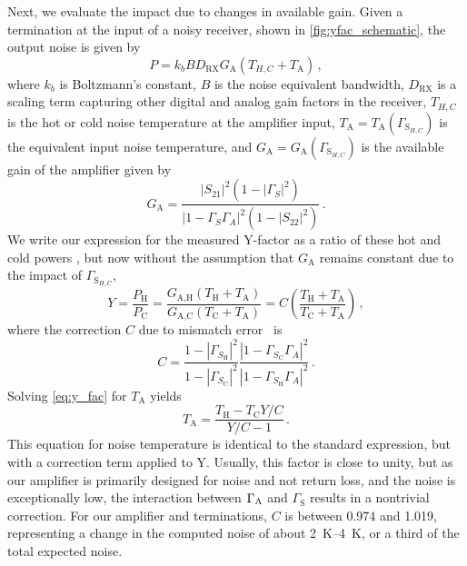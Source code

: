 Next, we evaluate the impact due to changes in available gain.
Given a termination at the input of a noisy receiver, shown in \autoref{fig:yfac_schematic}, the output noise is given by
%
\begin{equation}
	P = k_{b}BD_\text{RX}G_\text{A}\left(T_{H,C}+T_\text{A}\right) \,,
	\label{eq:noise_power}
\end{equation}
%
where $k_b$ is Boltzmann's constant, $B$ is the noise equivalent bandwidth, $D_\text{RX}$ is a scaling term capturing other digital and analog gain factors in the receiver, $T_{H,C}$ is the hot or cold noise temperature at the amplifier input, $T_\text{A}=T_\text{A}(\Gamma_{\text{S}_{H,C}})$ is the equivalent input noise temperature, and $G_\text{A} = G_\text{A}(\Gamma_{\text{S}_{H,C}})$ is the available gain of the amplifier given by
%
\begin{equation}
	G_{\text{A}} = \frac
	{|S_{21}|^{2}\left(1 - |\Gamma_{S}|^{2}\right)}
	{|1-\Gamma_{S}\Gamma_A|^{2} \left(1-|S_{22}|^2\right)} \,.
\end{equation}
%
We write our expression for the measured Y-factor as a ratio of these hot and cold powers \cite{hpnoise1983}, but now without the assumption that $G_\text{A}$ remains constant due to the impact of $\Gamma_{\text{S}_{H,C}}$,
%
\begin{equation}
	Y =
	\frac
	{P_\text{H}}
	{P_\text{C}} =
	\frac
	{G_{\text{A,H}}\left(T_\text{H} + T_\text{A}\right)}
	{G_{\text{A,C}}\left(T_\text{C} + T_\text{A}\right)} =
	C\left(
	\frac
	{T_\text{H} + T_\text{A}}
	{T_\text{C} + T_\text{A}}
	\right) \,,
	\label{eq:y_fac}
\end{equation}
%
where the correction $C$ due to mismatch error~\cite{heymannGuideNoiseMicrowave2021} is
%
\begin{equation}
	C =
	\frac
	{1 - |\Gamma_{S_\text{H}}|^{2}}
	{1 - |\Gamma_{S_\text{C}}|^{2}}
	\frac
	{|1-\Gamma_{S_\text{C}}\Gamma_A|^{2}}
	{|1-\Gamma_{S_\text{H}}\Gamma_A|^{2}} \,.
\end{equation}
%
Solving \eqref{eq:y_fac} for $T_\text{A}$ yields
%
\begin{equation}
	T_\text{A} = \frac{T_{\text{H}}-T_{\text{C}}Y/C}{Y/C-1} \,.
	\label{eqn:corrected_yfac}
\end{equation}
%
This equation for noise temperature is identical to the standard expression, but with a correction term applied to Y.
Usually, this factor is close to unity, but as our amplifier is primarily designed for noise and not return loss, and the noise is exceptionally low, the interaction between $\Gamma_{\text{A}}$ and $\Gamma_\text{S}$ results in a nontrivial correction.
For our amplifier and terminations, $C$ is between \num{0.974} and \num{1.019}, representing a change in the computed noise of about \qtyrange{2}{4}{\K}, or a third of the total expected noise.

